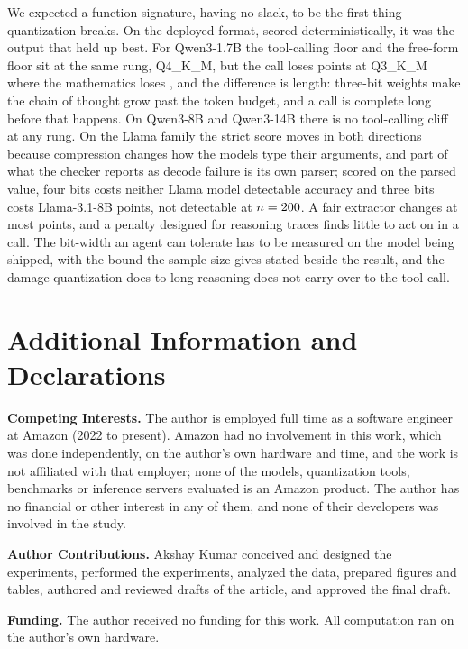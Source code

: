 \documentclass[12pt,letterpaper]{article}
\newcommand{\qm}{Qwen3-1.7B}
\begin{document}
We expected a function signature, having no slack, to be the first thing quantization breaks. On the deployed format, scored deterministically, it was the output that held up best. For \qm{} the tool-calling floor and the free-form floor sit at the same rung, Q4\_K\_M, but the call loses \qtDropThree{} points at Q3\_K\_M where the mathematics loses \qtGsmDropThree{}, and the difference is length: three-bit weights make the chain of thought grow past the token budget, and a call is complete long before that happens. On Qwen3-8B and Qwen3-14B there is no tool-calling cliff at any rung. On the Llama family the strict score moves in both directions because compression changes how the models type their arguments, and part of what the checker reports as decode failure is its own parser; scored on the parsed value, four bits costs neither Llama model detectable accuracy and three bits costs Llama-3.1-8B \qtCoercedDropLlamaEightBThree{} points, not detectable at $n=200{}$. A fair extractor changes at most \qtGsmGapMax{} points, and a penalty designed for reasoning traces finds little to act on in a call. The bit-width an agent can tolerate has to be measured on the model being shipped, with the bound the sample size gives stated beside the result, and the damage quantization does to long reasoning does not carry over to the tool call.

\section*{Additional Information and Declarations}

\textbf{Competing Interests.} The author is employed full time as a software engineer at Amazon (2022 to present). Amazon had no involvement in this work, which was done independently, on the author's own hardware and time, and the work is not affiliated with that employer; none of the models, quantization tools, benchmarks or inference servers evaluated is an Amazon product. The author has no financial or other interest in any of them, and none of their developers was involved in the study.

\textbf{Author Contributions.} Akshay Kumar conceived and designed the experiments, performed the experiments, analyzed the data, prepared figures and tables, authored and reviewed drafts of the article, and approved the final draft.

\textbf{Funding.} The author received no funding for this work. All computation ran on the author's own hardware.
\end{document}
